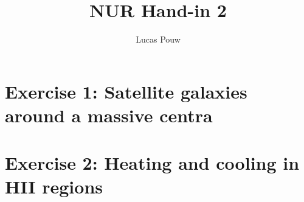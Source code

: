 \documentclass[a4paper,10pt]{article}
\title{NUR Hand-in 2}
\author{Lucas Pouw}
\begin{document}
\maketitle

\section{Exercise 1: Satellite galaxies around a massive centra}



















\section{Exercise 2: Heating and cooling in HII regions}






\end{document}
